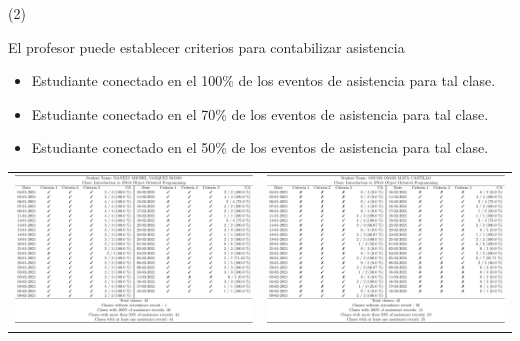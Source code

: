 \begin{frame}{\citetitle{\EntradaBibtex} (2)}

El profesor puede establecer criterios para contabilizar asistencia
\begin{itemize}
\item Estudiante conectado en el 100\% de los eventos de asistencia para tal clase.
\item Estudiante conectado en el 70\% de los eventos de asistencia para tal clase.
\item Estudiante conectado en el 50\% de los eventos de asistencia para tal clase.
\end{itemize}
\begin{center}
	\begin{tabular}{cc}

		\includegraphics[width=0.40\linewidth]{2021_ListaOnLine/figs/Informe1.png} &
		\includegraphics[width=0.40\linewidth]{2021_ListaOnLine/figs/Informe2.png} \\
	\end{tabular}
\end{center}

\end{frame}




